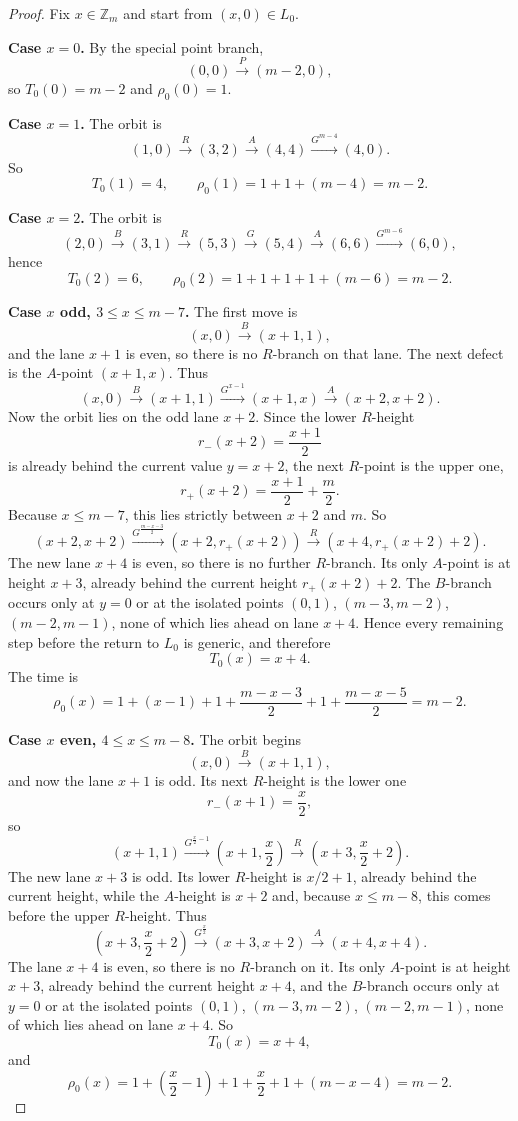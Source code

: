 \documentclass[11pt]{article}
\newcommand{\Zm}{\mathbb Z_m}
\begin{document}
\begin{proof}
Fix $x\in \Zm$ and start from $(x,0)\in L_0$.

\smallskip
\noindent\textbf{Case $x=0$.}
By the special point branch,
\[
(0,0)\xrightarrow{P}(m-2,0),
\]
so $T_0(0)=m-2$ and $\rho_0(0)=1$.

\smallskip
\noindent\textbf{Case $x=1$.}
The orbit is
\[
(1,0)\xrightarrow{R}(3,2)\xrightarrow{A}(4,4)\xrightarrow{G^{m-4}}(4,0).
\]
So
\[
T_0(1)=4,\qquad \rho_0(1)=1+1+(m-4)=m-2.
\]

\smallskip
\noindent\textbf{Case $x=2$.}
The orbit is
\[
(2,0)\xrightarrow{B}(3,1)\xrightarrow{R}(5,3)\xrightarrow{G}(5,4)\xrightarrow{A}(6,6)
\xrightarrow{G^{m-6}}(6,0),
\]
hence
\[
T_0(2)=6,\qquad \rho_0(2)=1+1+1+1+(m-6)=m-2.
\]

\smallskip
\noindent\textbf{Case $x$ odd, $3\le x\le m-7$.}
The first move is
\[
(x,0)\xrightarrow{B}(x+1,1),
\]
and the lane $x+1$ is even, so there is no $R$-branch on that lane.
The next defect is the $A$-point $(x+1,x)$.
Thus
\[
(x,0)\xrightarrow{B}(x+1,1)\xrightarrow{G^{x-1}}(x+1,x)\xrightarrow{A}(x+2,x+2).
\]
Now the orbit lies on the odd lane $x+2$.
Since the lower $R$-height
\[
r_-(x+2)=\frac{x+1}{2}
\]
is already behind the current value $y=x+2$, the next $R$-point is the upper one,
\[
r_+(x+2)=\frac{x+1}{2}+\frac m2.
\]
Because $x\le m-7$, this lies strictly between $x+2$ and $m$.
So
\[
(x+2,x+2)\xrightarrow{G^{\frac{m-x-3}{2}}}\left(x+2,r_+(x+2)\right)\xrightarrow{R}\left(x+4,r_+(x+2)+2\right).
\]
The new lane $x+4$ is even, so there is no further $R$-branch.
Its only $A$-point is at height $x+3$, already behind the current height $r_+(x+2)+2$.
The $B$-branch occurs only at $y=0$ or at the isolated points $(0,1)$, $(m-3,m-2)$, $(m-2,m-1)$, none of
which lies ahead on lane $x+4$.
Hence every remaining step before the return to $L_0$ is generic, and therefore
\[
T_0(x)=x+4.
\]
The time is
\[
\rho_0(x)
=
1+(x-1)+1+\frac{m-x-3}{2}+1+\frac{m-x-5}{2}
=
m-2.
\]

\smallskip
\noindent\textbf{Case $x$ even, $4\le x\le m-8$.}
The orbit begins
\[
(x,0)\xrightarrow{B}(x+1,1),
\]
and now the lane $x+1$ is odd.
Its next $R$-height is the lower one
\[
r_-(x+1)=\frac{x}{2},
\]
so
\[
(x+1,1)\xrightarrow{G^{\frac{x}{2}-1}}\left(x+1,\frac{x}{2}\right)\xrightarrow{R}\left(x+3,\frac{x}{2}+2\right).
\]
The new lane $x+3$ is odd.
Its lower $R$-height is $x/2+1$, already behind the current height, while the $A$-height is $x+2$ and,
because $x\le m-8$, this comes before the upper $R$-height.
Thus
\[
\left(x+3,\frac{x}{2}+2\right)\xrightarrow{G^{\frac{x}{2}}}(x+3,x+2)\xrightarrow{A}(x+4,x+4).
\]
The lane $x+4$ is even, so there is no $R$-branch on it.
Its only $A$-point is at height $x+3$, already behind the current height $x+4$, and the $B$-branch occurs
only at $y=0$ or at the isolated points $(0,1)$, $(m-3,m-2)$, $(m-2,m-1)$, none of which lies ahead on
lane $x+4$.
So
\[
T_0(x)=x+4,
\]
and
\[
\rho_0(x)
=
1+\left(\frac{x}{2}-1\right)+1+\frac{x}{2}+1+(m-x-4)
=
m-2.
\]


\end{proof}
\end{document}
